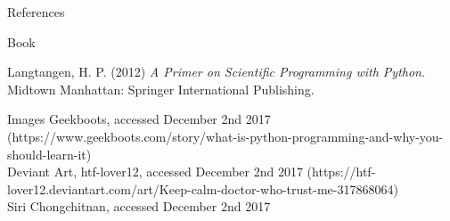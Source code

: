 \documentclass{beamer}
\begin{document}
\begin{frame}[t]{References}
\begin{block}{Book}
\begin{thebibliography}{99}
Langtangen, H. P. (2012) \textit{A Primer on Scientific Programming with Python}. Midtown Manhattan: Springer International Publishing.
\end{thebibliography}
\end{block}
\begin{block}{Images}
\vspace{1pt}
Geekboots, accessed December 2nd 2017 (https://www.geekboots.com/story/what-is-python-programming-and-why-you-should-learn-it)\\
Deviant Art, htf-lover12, accessed December 2nd 2017 (https://htf-lover12.deviantart.com/art/Keep-calm-doctor-who-trust-me-317868064)\\
Siri Chongchitnan, accessed December 2nd 2017
\end{block}
\end{frame}
\end{document}
